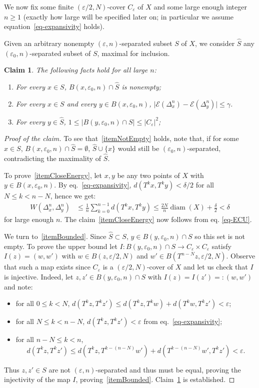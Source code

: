 \documentclass[10pt]{amsart}
\theoremstyle{definition}\newtheorem{defi}[theo]{Definition}\newtheorem{rema}[theo]{Remark}\newtheorem{exam}[theo]{Example}\newtheorem{exem}[theo]{Example}\newtheorem{nota}[theo]{Notation}
\theoremstyle{plain}
\theoremstyle{plain}
\newtheorem{claim}{Claim}
\newcommand\eps{\varepsilon}
\newcommand{\diam}{\operatorname{diam}}
\newcounter{In}
\newcommand*\8{\infty}
\newcommand\hS{\widehat{S}}
\newcommand{\En}{\mathcal{E}}
\newcommand*{\romanenumi}{\renewcommand*{\theenumi}{\roman{enumi}}}
\begin{document}
We now fix some finite $(\eps/2,N)$-cover $C_\eps$ of $X$ and some large enough integer $n\geq1$ (exactly how large will be specified later on; in particular we assume equation~\eqref{eq-expansivity} holds).


Given an arbitrary nonempty $(\eps,n)$-separated subset $S$ of $X$, we consider $\hS$ any $(\eps_0,n)$-separated subset of $S$, maximal for inclusion.

\begin{claim}\label{claim-W}
The following facts hold for all large $n$:
\begin{enumerate}\romanenumi
\item\label{itemNotEmpty}
For every $x\in S$, $B(x,\eps_0,n)\cap \hS$ is nonempty;
\item\label{itemCloseEnergy}
For every $x\in S$ and every $y\in B(x,\eps_0,n)$, $\lvert \En(\Delta^n_x)-\En(\Delta^n_y) \rvert \leq \gamma $.
\item\label{itemBounded}
For every $y\in \hS$, $1\le \lvert B(y,\eps_0,n)\cap S \rvert \le \lvert C_\eps\rvert^2$;
\end{enumerate}
\end{claim}

\begin{proof}[Proof of the claim]
To see that~\eqref{itemNotEmpty} holds, note that, if for some $x\in S$, $B(x,\eps_0,n)\cap \hS=\emptyset$, $\hS\cup\{x\}$ would still be $(\eps_0,n)$-separated, contradicting the maximality of $\hS$.

To prove~\eqref{itemCloseEnergy}, let $x,y$ be any two points of $X$ with $y\in B(x,\eps_0,n)$. By eq.~\eqref{eq-expansivity}, $d(T^kx,T^ky)<\delta/2$ for all $N\leq k<n-N$, hence we get:
\[
\begin{aligned}
W\left(\Delta^n_x,\Delta^n_y\right) &\leq \frac1n\sum_{k=0}^{n-1} d\left(T^kx,T^ky\right)
\leq \frac{2N}{n}\diam(X) + \frac\delta2 <\delta
\end{aligned}
\]
for large enough $n$. The claim~\eqref{itemCloseEnergy} now follows from eq. \eqref{eq-ECU}.

We turn to~\eqref{itemBounded}. Since $\hS\subset S$, $y\in B(y,\eps_0,n)\cap S$ so this set is not empty. To prove the upper bound let $I:B(y,\eps_0,n)\cap S\to C_\eps\times C_\eps$ satisfy $I(z)=(w,w')$ with $w\in B(z,\eps/2,N)$ and $w'\in B(T^{n-N}z,\eps/2,N)$. Observe that such a map exists since $C_\eps$ is a $(\eps/2,N)$-cover of $X$ and let us check that $I$ is injective. Indeed, let $z,z'\in B(y,\eps_0,n)\cap S$ with $I(z)=I(z')=:(w,w')$ and note:
\begin{itemize}
\item for all $0\leq k<N$, $d(T^kz,T^kz')\leq d(T^kz,T^kw)+d(T^kw,T^kz') <\eps$;
\item for all $N\leq k<n-N$, $d(T^kz,T^kz') < \eps$ from eq.~\eqref{eq-expansivity};
\item for all $n-N\leq k<n$,
\[
d\left(T^kz,T^kz'\right)\leq d\left(T^kz,T^{k-(n-N)}w'\right)+d\left(T^{k-(n-N)}w',T^kz'\right) <\eps.
\]
\end{itemize}
Thus $z,z'\in S$ are not $(\eps,n)$-separated and thus must be equal, proving the injectivity of the map $I$, proving~\eqref{itemBounded}. Claim~\ref{claim-W} is established.
\end{proof}
\end{document}
